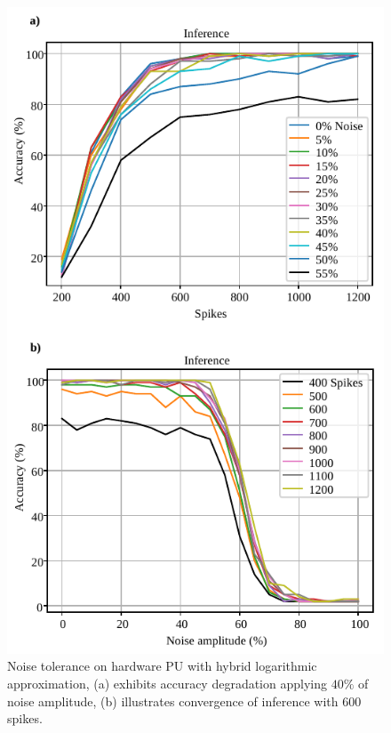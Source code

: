 \begin{figure}[t!]
	\centering
	\includegraphics[width=1\columnwidth]{../figures/accuracy_vs_noise_pu_log.pdf}
	\caption{Noise tolerance on hardware PU with hybrid logarithmic approximation, (a) exhibits accuracy degradation applying $40\%$ of noise amplitude, (b) illustrates convergence of inference with $600$ spikes.}
	\label{fig:accuracy_vs_noise_pu_log}
\end{figure}


